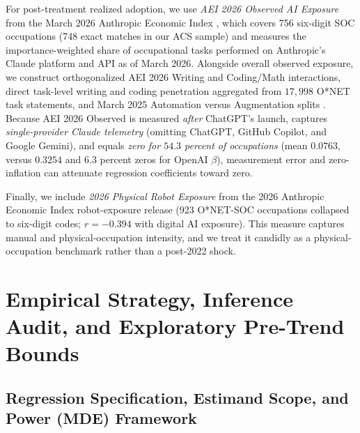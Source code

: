 \documentclass[11pt]{amsart}
\begin{document}
For post-treatment realized adoption, we use \emph{AEI 2026 Observed AI Exposure} from the March 2026 Anthropic Economic Index \citep{MassenkoffMcCrory2026}, which covers 756 six-digit SOC occupations (748 exact matches in our ACS sample) and measures the importance-weighted share of occupational tasks performed on Anthropic's Claude platform and API as of March 2026. Alongside overall observed exposure, we construct orthogonalized AEI 2026 Writing and Coding/Math interactions, direct task-level writing and coding penetration aggregated from $17{,}998$ O*NET task statements, and March 2025 Automation versus Augmentation splits \citep[flagged for 2025--2026 capability drift]{Handa2025}. Because AEI 2026 Observed is measured \emph{after} ChatGPT's launch, captures \emph{single-provider Claude telemetry} (omitting ChatGPT, GitHub Copilot, and Google Gemini), and equals \emph{zero for $54.3$ percent of occupations} (mean $0.0763$, versus $0.3254$ and $6.3$ percent zeros for OpenAI $\beta$), measurement error and zero-inflation can attenuate regression coefficients toward zero.

Finally, we include \emph{2026 Physical Robot Exposure} from the 2026 Anthropic Economic Index robot-exposure release (923 O*NET-SOC occupations collapsed to six-digit codes; $r = -0.394$ with digital AI exposure). This measure captures manual and physical-occupation intensity, and we treat it candidly as a physical-occupation benchmark rather than a post-2022 shock.

\section{Empirical Strategy, Inference Audit, and Exploratory Pre-Trend Bounds}

\subsection{Regression Specification, Estimand Scope, and Power (MDE) Framework}
\end{document}
